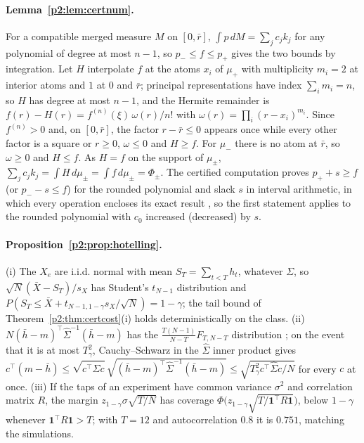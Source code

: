 \paragraph{Lemma~\ref{p2:lem:certnum}.} For a compatible merged measure $M$ on $[0,\bar r]$, $\int p\,dM=\sum_jc_jk_j$ for any polynomial of degree at most $n-1$, so $p_-\le f\le p_+$ gives the two bounds by integration. Let $H$ interpolate $f$ at the atoms $x_i$ of $\mu_+$ with multiplicity $m_i=2$ at interior atoms and $1$ at $0$ and $\bar r$; principal representations have index $\sum_im_i=n$, so $H$ has degree at most $n-1$, and the Hermite remainder is $f(r)-H(r)=f^{(n)}(\xi)\,\omega(r)/n!$ with $\omega(r)=\prod_i(r-x_i)^{m_i}$. Since $f^{(n)}>0$ and, on $[0,\bar r]$, the factor $r-\bar r\le0$ appears once while every other factor is a square or $r\ge0$, $\omega\le0$ and $H\ge f$. For $\mu_-$ there is no atom at $\bar r$, so $\omega\ge0$ and $H\le f$. As $H=f$ on the support of $\mu_\pm$, $\sum_jc_jk_j=\int H\,d\mu_\pm=\int f\,d\mu_\pm=\Phi_\pm$. The certified computation proves $p_++s\ge f$ (or $p_--s\le f$) for the rounded polynomial and slack $s$ in interval arithmetic, in which every operation encloses its exact result \citep{p2:rump2010}, so the first statement applies to the rounded polynomial with $c_0$ increased (decreased) by $s$.

\paragraph{Proposition~\ref{p2:prop:hotelling}.} (i) The $X_e$ are i.i.d. normal with mean $S_T=\sum_{t<T}h_t$, whatever $\Sigma$, so $\sqrt N(\bar X-S_T)/s_X$ has Student's $t_{N-1}$ distribution and $P(S_T\le\bar X+t_{N-1,1-\gamma}s_X/\sqrt N)=1-\gamma$; the tail bound of Theorem~\ref{p2:thm:certcost}(i) holds deterministically on the class. (ii) $N(\bar h-m)^\top\hat\Sigma^{-1}(\bar h-m)$ has the $\frac{T(N-1)}{N-T}F_{T,N-T}$ distribution \citep{p2:hotelling1931}; on the event that it is at most $T^2_\gamma$, Cauchy--Schwarz in the $\hat\Sigma$ inner product gives $c^\top(m-\bar h)\le\sqrt{c^\top\hat\Sigma c}\,\sqrt{(\bar h-m)^\top\hat\Sigma^{-1}(\bar h-m)}\le\sqrt{T^2_\gamma c^\top\hat\Sigma c/N}$ for every $c$ at once. (iii) If the taps of an experiment have common variance $\sigma^2$ and correlation matrix $R$, the margin $z_{1-\gamma}\sigma\sqrt{T/N}$ has coverage $\Phi\bigl(z_{1-\gamma}\sqrt{T/\mathbf 1^\top R\mathbf 1}\bigr)$, below $1-\gamma$ whenever $\mathbf 1^\top R\mathbf 1>T$; with $T=12$ and autocorrelation $0.8$ it is $0.751$, matching the simulations.


